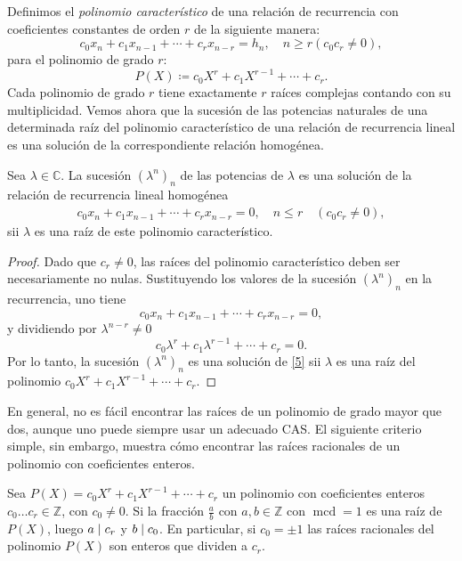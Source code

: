 \begin{definition}
	Definimos el \emph{polinomio característico} de una relación de recurrencia con coeficientes constantes de orden $r$ de la siguiente manera: \[ c_{0}x_{n}+c_{1}x_{n-1}+\cdots+c_{r}x_{n-r}=h_{n},\quad n\geq r\left(c_{0}c_{r}\neq0\right), \] para el polinomio de grado $r$: \[ P(X)\coloneqq c_{0}X^{r}+c_{1}X^{r-1}+\cdots+c_{r}. \] Cada polinomio de grado $r$ tiene exactamente $r$ raíces complejas contando con su multiplicidad. Vemos ahora que la sucesión de las potencias naturales de una determinada raíz del polinomio característico de una relación de recurrencia lineal es una solución de la correspondiente relación homogénea.
\end{definition}

\begin{proposition}
	Sea $\lambda\in\mathds{C}$. La sucesión $\left(\lambda^{n}\right)_{n}$ de las potencias de $\lambda$ es una solución de la relación de recurrencia lineal homogénea
	\begin{align}\label{5}
	c_{0}x_{n}+c_{1}x_{n-1}+\cdots+c_{r}x_{n-r}=0,\quad n\leq r \quad (c_{0}c_{r}\neq 0),
	\end{align}
	sii $\lambda$ es una raíz de este polinomio característico.
\end{proposition}

\begin{proof}
	Dado que $c_{r}\neq0$, las raíces del polinomio característico deben ser necesariamente no nulas. Sustituyendo los valores de la sucesión ${\left(\lambda^{n}\right)}_{n}$ en la recurrencia, uno tiene \[ c_{0}x_{n}+c_{1}x_{n-1}+\cdots+c_{r}x_{n-r}=0, \] y dividiendo por $\lambda^{n-r}\neq0$ \[ c_{0}\lambda^{r}+c_{1}\lambda^{r-1}+\cdots+c_{r}=0. \]	Por lo tanto, la sucesión ${\left(\lambda^{n}\right)}_{n}$ es una solución de \eqref{5} sii $\lambda$ es una raíz del polinomio $c_{0}X^{r}+c_{1}X^{r-1}+\cdots+c_{r}$.
\end{proof}

En general, no es fácil encontrar las raíces de un polinomio de grado mayor que dos, aunque uno puede siempre usar un adecuado CAS. El siguiente criterio simple, sin embargo, muestra cómo encontrar las raíces racionales de un polinomio con coeficientes enteros.

\begin{proposition}
	Sea $P(X)=c_{0}X^{r}+c_{1}X^{r-1}+\cdots+c_{r}$ un polinomio con coeficientes enteros $c_{0}\ldots c_{r}\in\mathds{Z}$, con $c_{0}\neq 0$. Si la fracción $\tfrac{a}{b}$ con $a,b\in\mathds{Z}$ con $\operatorname{mcd}=1$ es una raíz de $P(X)$, luego $a\mid c_{r}$ y $b\mid c_{0}$. En particular, si $c_{0}=\pm1$ las raíces racionales del polinomio $P(X)$ son enteros que dividen a $c_{r}$.
\end{proposition}

